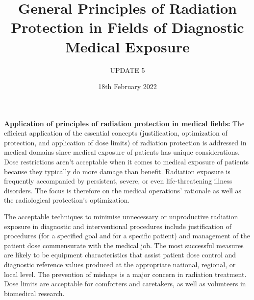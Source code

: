 \documentclass[12pt]{article}
\title{ General Principles of Radiation Protection in Fields of Diagnostic Medical Exposure}
\author{UPDATE 5}
\date{18th February 2022}
\begin{document}
\maketitle

\textbf{Application of principles of radiation protection in medical fields:}
The efficient application of the essential concepts (justification, optimization of protection, and application of dose limits) of radiation protection is addressed in medical domains since medical exposure of patients has unique considerations. Dose restrictions aren't acceptable when it comes to medical exposure of patients because they typically do more damage than benefit. Radiation exposure is frequently accompanied by persistent, severe, or even life-threatening illness disorders. The focus is therefore on the medical operations' rationale as well as the radiological protection's optimization.

The acceptable techniques to minimise unnecessary or unproductive radiation exposure in diagnostic and interventional procedures include justification of procedures (for a specified goal and for a specific patient) and management of the patient dose commensurate with the medical job. The most successful measures are likely to be equipment characteristics that assist patient dose control and diagnostic reference values produced at the appropriate national, regional, or local level. The prevention of mishaps is a major concern in radiation treatment. Dose limits are acceptable for comforters and caretakers, as well as volunteers in biomedical research.
\end{document}
